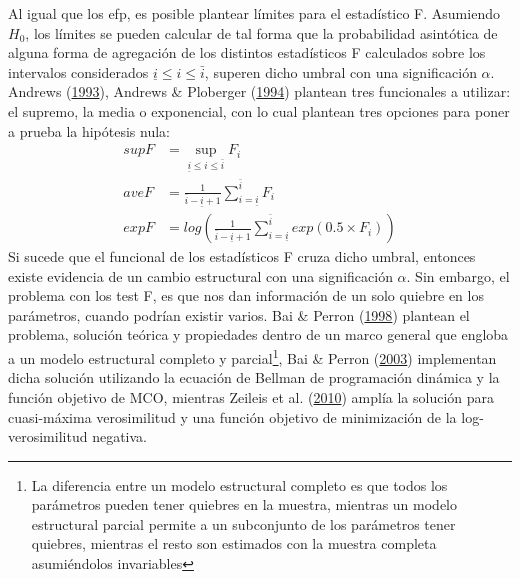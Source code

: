 \documentclass[12pt,oneside]{reedthesis}
\begin{document}
Al igual que los efp, es posible plantear límites para el estadístico F. Asumiendo \(H_0\), los límites se pueden calcular de tal forma que la probabilidad asintótica de alguna forma de agregación de los distintos estadísticos F calculados sobre los intervalos considerados \(\underline i \leq i \leq \bar{i}\), superen dicho umbral con una significación \(\alpha\). Andrews (\protect\hyperlink{ref-Andrews1993}{1993}), Andrews \& Ploberger (\protect\hyperlink{ref-Andrews1994}{1994}) plantean tres funcionales a utilizar: el supremo, la media o exponencial, con lo cual plantean tres opciones para poner a prueba la hipótesis nula:
\begin{align}
supF &= \sup_{\underline i \leq i \leq \bar{i}} F_i \\
aveF &= \frac{1}{\bar{i} - \underline i + 1}\sum_{i = \underline i}^{\bar{i}}F_i \\
expF &= log \left( \frac{1}{\bar{i}-\underline i + 1}\sum_{i = \underline i}^{\bar{i}}exp(0.5\times F_i) \right)
\end{align}
Si sucede que el funcional de los estadísticos F cruza dicho umbral, entonces existe evidencia de un cambio estructural con una significación \(\alpha\). Sin embargo, el problema con los test F, es que nos dan información de un solo quiebre en los parámetros, cuando podrían existir varios. Bai \& Perron (\protect\hyperlink{ref-BaiPerron1998}{1998}) plantean el problema, solución teórica y propiedades dentro de un marco general que engloba a un modelo estructural completo y parcial\footnote{La diferencia entre un modelo estructural completo es que todos los parámetros pueden tener quiebres en la muestra, mientras un modelo estructural parcial permite a un subconjunto de los parámetros tener quiebres, mientras el resto son estimados con la muestra completa asumiéndolos invariables}, Bai \& Perron (\protect\hyperlink{ref-BaiPerron2003}{2003}) implementan dicha solución utilizando la ecuación de Bellman de programación dinámica y la función objetivo de MCO, mientras Zeileis et al. (\protect\hyperlink{ref-Zeileis2010}{2010}) amplía la solución para cuasi-máxima verosimilitud y una función objetivo de minimización de la log-verosimilitud negativa.
\end{document}
